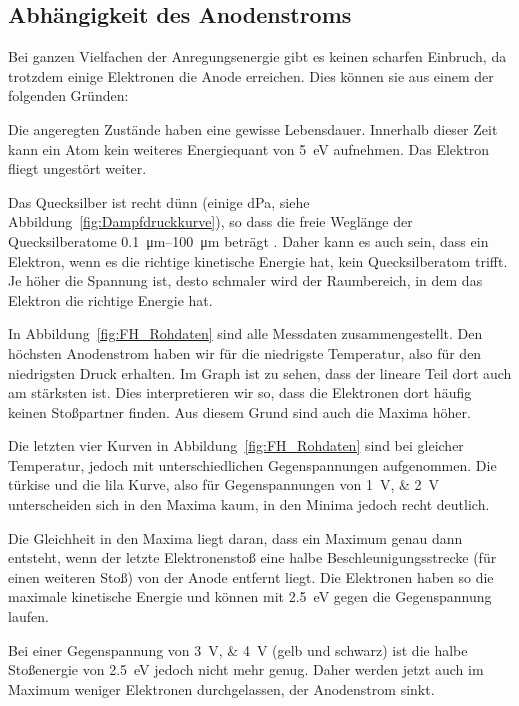 \subsection{Abhängigkeit des Anodenstroms}

Bei ganzen Vielfachen der Anregungsenergie gibt es keinen scharfen Einbruch, da
trotzdem einige Elektronen die Anode erreichen. Dies können sie aus einem der
folgenden Gründen:

Die angeregten Zustände haben eine gewisse Lebensdauer. Innerhalb dieser Zeit
kann ein Atom kein weiteres Energiequant von \SI{5}{\electronvolt} aufnehmen.
Das Elektron fliegt ungestört weiter.

Das Quecksilber ist recht dünn (einige \si{\deka\pascal}, siehe
Abbildung~\ref{fig:Dampfdruckkurve}), so dass die freie Weglänge der
Quecksilberatome \SIrange{0.1}{100}{\micro\meter} beträgt
\parencite{wikipedia/Mittlere_freie_Weglaenge}. Daher kann es auch sein, dass
ein Elektron, wenn es die richtige kinetische Energie hat, kein Quecksilberatom
trifft. Je höher die Spannung ist, desto schmaler wird der Raumbereich, in dem
das Elektron die richtige Energie hat.

In Abbildung~\ref{fig:FH_Rohdaten} sind alle Messdaten zusammengestellt. Den
höchsten Anodenstrom haben wir für die niedrigste Temperatur, also für den
niedrigsten Druck erhalten. Im Graph ist zu sehen, dass der lineare Teil dort
auch am stärksten ist. Dies interpretieren wir so, dass die Elektronen dort
häufig keinen Stoßpartner finden. Aus diesem Grund sind auch die Maxima höher.

Die letzten vier Kurven in Abbildung~\ref{fig:FH_Rohdaten} sind bei gleicher
Temperatur, jedoch mit unterschiedlichen Gegenspannungen aufgenommen. Die
türkise und die lila Kurve, also für Gegenspannungen von \SIlist{1;2}{\volt}
unterscheiden sich in den Maxima kaum, in den Minima jedoch recht deutlich.

Die Gleichheit in den Maxima liegt daran, dass ein Maximum genau dann entsteht,
wenn der letzte Elektronenstoß eine halbe Beschleunigungsstrecke (für einen
weiteren Stoß) von der Anode entfernt liegt. Die Elektronen haben so die
maximale kinetische Energie und können mit \SI{2.5}{\electronvolt} gegen die
Gegenspannung laufen.

Bei einer Gegenspannung von \SIlist{3;4}{\volt} (gelb und schwarz) ist die
halbe Stoßenergie von \SI{2.5}{\electronvolt} jedoch nicht mehr genug. Daher
werden jetzt auch im Maximum weniger Elektronen durchgelassen, der Anodenstrom
sinkt.

